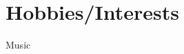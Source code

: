 \documentclass[11pt,a4paper,sans]{moderncv} %
\begin{document}

\section{Hobbies/Interests}

\renewcommand{\listitemsymbol}{-~} %
 {Music}








\end{document}
